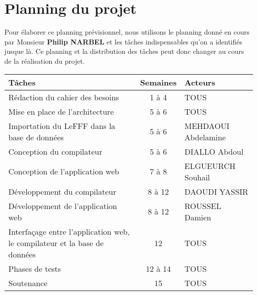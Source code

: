 
\section{Planning du projet}
{Pour élaborer ce planning prévisionnel, nous utilisons le planning  donné en cours par Monsieur \textbf{Philip NARBEL} et les tâches indispensables qu'on a identifiés jusque là. Ce planning et la distribution des tâches peut donc changer au cours de la réalisation du projet.\par}
\vspace{1cm}
 \begin{tabularx}{\textwidth}{|p{7cm}|c|X|}
    \hline
    \textbf{Tâches} & 
    \textbf{Semaines} & 
    \textbf{Acteurs} \tabularnewline
    \hline
    Rédaction du cahier des besoins & 1 à 4 & TOUS \tabularnewline
    \hline
    Mise en place de l'architecture   & 5 à 6  & TOUS \tabularnewline
    \hline
    Importation du LeFFF dans la base de données  & 5 à 6 & MEHDAOUI Abdelamine \tabularnewline
    \hline
    Conception du compilateur & 5 à 6 & DIALLO Abdoul \tabularnewline
    \hline
    Conception de l'application web & 7 à 8 & ELGUEURCH Souhail  \tabularnewline
    \hline
    Développement du compilateur & 8 à 12 & DAOUDI YASSIR \tabularnewline
    \hline
    Développement de l'application web & 8 à 12 & ROUSSEL Damien \tabularnewline
    \hline
    Interfaçage entre l'application web, le compilateur et la base de données & 12 & TOUS \tabularnewline
    \hline
    Phases de tests  & 12 à 14 & TOUS \tabularnewline
   \hline
    Soutenance & 15 & TOUS \tabularnewline
   \hline
\end{tabularx}


